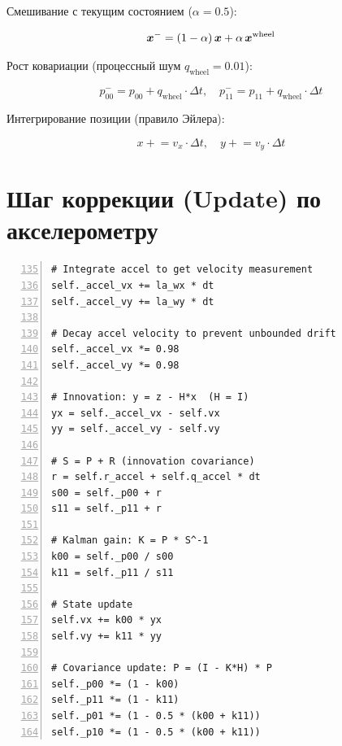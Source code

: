 Смешивание с текущим состоянием ($\alpha = 0.5$):

\begin{equation}
  \bm{x}^- = (1-\alpha)\,\bm{x} + \alpha\,\bm{x}^{\text{wheel}}
  \label{eq:blend}
\end{equation}

Рост ковариации (процессный шум $q_{\text{wheel}} = 0.01$):

\begin{equation}
  p_{00}^- = p_{00} + q_{\text{wheel}} \cdot \Delta t, \quad
  p_{11}^- = p_{11} + q_{\text{wheel}} \cdot \Delta t
  \label{eq:cov_grow}
\end{equation}

Интегрирование позиции (правило Эйлера):

\begin{equation}
  \boxed{x \mathrel{+}= v_x \cdot \Delta t, \quad y \mathrel{+}= v_y \cdot \Delta t}
  \label{eq:pos_integrate}
\end{equation}

\section{Шаг коррекции (Update) по акселерометру}
\label{sec:ekf_update}

\begin{filebox}[title={\filepath{velocity\_ekf.py}, строки 122--173 --- update\_accel()}]
\begin{lstlisting}[style=pythonstyle, numbers=left, firstnumber=135]
# Integrate accel to get velocity measurement
self._accel_vx += la_wx * dt
self._accel_vy += la_wy * dt

# Decay accel velocity to prevent unbounded drift
self._accel_vx *= 0.98
self._accel_vy *= 0.98

# Innovation: y = z - H*x  (H = I)
yx = self._accel_vx - self.vx
yy = self._accel_vy - self.vy

# S = P + R (innovation covariance)
r = self.r_accel + self.q_accel * dt
s00 = self._p00 + r
s11 = self._p11 + r

# Kalman gain: K = P * S^-1
k00 = self._p00 / s00
k11 = self._p11 / s11

# State update
self.vx += k00 * yx
self.vy += k11 * yy

# Covariance update: P = (I - K*H) * P
self._p00 *= (1 - k00)
self._p11 *= (1 - k11)
self._p01 *= (1 - 0.5 * (k00 + k11))
self._p10 *= (1 - 0.5 * (k00 + k11))
\end{lstlisting}
\end{filebox}

